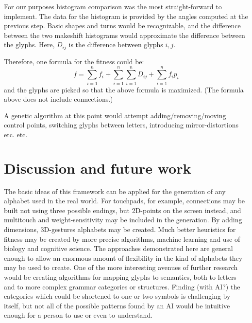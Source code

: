 \documentclass[conference]{IEEEtran}
\begin{document}
For our purposes histogram comparison was the most straight-forward to implement. The data for the histogram is provided by the angles computed at the previous step. Basic shapes and turns would be recognizable, and the difference between the two makeshift histograms would approximate the difference between the glyphs. Here, \(D_{ij}\) is the difference between glyphs \(i, j\).

Therefore, one formula for the fitness could be:
\[
f=\sum^{n}_{i=1}f_i+
\sum^{n}_{i=1}\sum^{n}_{i=1}D_{ij}+
\sum^{n}_{i=1}f_ip_i
\]
and the glyphs are picked so that the above formula is maximized. (The formula above does not include connections.)

A genetic algorithm at this point would attempt adding/removing/moving control points, switching glyphs between letters, introducing mirror-distortions etc. etc.

\section{Discussion and future work}
The basic ideas of this framework can be applied for the generation of any alphabet used in the real world. For touchpads, for example, connections may be built not using three possible endings, but 2D-points on the screen instead, and multitouch and weight-sensitivity may be included in the generation. By adding dimensions, 3D-gestures alphabets may be created. Much better heuristics for fitness may be created by more precise algorithms, machine learning and use of biology and cognitive science. The approaches demonstrated here are general enough to allow an enormous amount of flexibility in the kind of alphabets they may be used to create.
	One of the more interesting avenues of further research would be creating algorithms for mapping glyphs to semantics, both to letters and to more complex grammar categories or structures. Finding (with AI?) the categories which could be shortened to one or two symbols is challenging by itself, but not all of the possible patterns found by an AI would be intuitive enough for a person to use or even to understand. 



\end{document}
